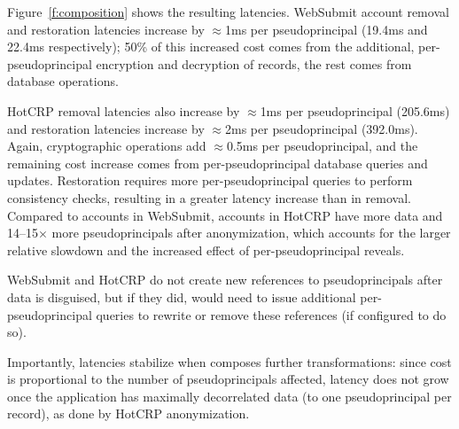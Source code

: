%
Figure~\ref{f:composition} shows the resulting latencies.
%
WebSubmit account removal and restoration latencies increase by $\approx$1ms per
pseudoprincipal (19.4ms and 22.4ms respectively); 50\% of this increased cost
comes from the additional, per-pseudoprincipal encryption and decryption of
records, the rest comes from database operations.

%
HotCRP removal latencies also increase by $\approx$1ms per pseudoprincipal
(205.6ms) and restoration latencies increase by $\approx$2ms per pseudoprincipal
(392.0ms). Again, cryptographic operations add $\approx$0.5ms per
pseudoprincipal, and the remaining cost increase comes from
per-pseudo\allowbreak principal
database queries and updates. Restoration requires more per-pseudoprincipal
queries to \eg perform consistency checks, resulting in a greater latency
increase than in removal. 
%
Compared to accounts in WebSubmit, accounts in HotCRP have more data and
14--15$\times$ more pseudoprincipals after anonymization, which accounts for the
larger relative slowdown and the increased effect of per-pseudoprincipal
reveals.

WebSubmit and HotCRP do not create new references to pseudoprincipals after data
is disguised, but if they did, \sys would need to issue additional
per-pseudoprincipal queries to rewrite or remove these references (if configured
to do so).
%
%
%
%
%

%
Importantly, \xxing latencies stabilize when \sys composes further \xxing
transformations: since cost is proportional to the number of pseudoprincipals
affected, latency does not grow once the application has maximally decorrelated
data (to one pseudoprincipal per record), as done by HotCRP anonymization.
%



